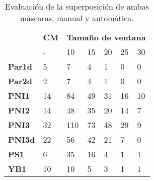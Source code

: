 \begin{table}[]
    \begin{threeparttable}[b]
        \caption{Evaluación de la superposición de ambas máscaras, manual y automática.}
        \begin{tabular}{l|l|lllll|}
            \cline{2-7}
            \multirow{2}{*}{}                    & \textbf{CM\tnote{1}} & \multicolumn{5}{l|}{\textbf{Tamaño de ventana}}                                                                             \\ \cline{3-7} 
                                                 & -           & \multicolumn{1}{l|}{10}     & \multicolumn{1}{l|}{15}     & \multicolumn{1}{l|}{20}    & \multicolumn{1}{l|}{25}    & 30    \\ \hline
            \multicolumn{1}{|l|}{\textbf{Par1d}} & 5           & \multicolumn{1}{l|}{7}      & \multicolumn{1}{l|}{4}      & \multicolumn{1}{l|}{1}     & \multicolumn{1}{l|}{0}     & 0     \\ \hline
            \multicolumn{1}{|l|}{\textbf{Par2d}} & 2           & \multicolumn{1}{l|}{7}      & \multicolumn{1}{l|}{4}      & \multicolumn{1}{l|}{1}     & \multicolumn{1}{l|}{0}     & 0     \\ \hline
            \multicolumn{1}{|l|}{\textbf{PNI1}}  & 14          & \multicolumn{1}{l|}{84}     & \multicolumn{1}{l|}{49}     & \multicolumn{1}{l|}{31}    & \multicolumn{1}{l|}{16}    & 10    \\ \hline
            \multicolumn{1}{|l|}{\textbf{PNI2}}  & 14          & \multicolumn{1}{l|}{48}     & \multicolumn{1}{l|}{35}     & \multicolumn{1}{l|}{20}    & \multicolumn{1}{l|}{14}    & 7     \\ \hline
            \multicolumn{1}{|l|}{\textbf{PNI3}}  & 32          & \multicolumn{1}{l|}{110}    & \multicolumn{1}{l|}{73}     & \multicolumn{1}{l|}{48}    & \multicolumn{1}{l|}{29}    & 9     \\ \hline
            \multicolumn{1}{|l|}{\textbf{PNI3d}} & 22          & \multicolumn{1}{l|}{56}     & \multicolumn{1}{l|}{42}     & \multicolumn{1}{l|}{21}    & \multicolumn{1}{l|}{7}     & 0     \\ \hline
            \multicolumn{1}{|l|}{\textbf{PS1}}   & 6           & \multicolumn{1}{l|}{35}     & \multicolumn{1}{l|}{16}     & \multicolumn{1}{l|}{4}     & \multicolumn{1}{l|}{1}     & 1     \\ \hline
            \multicolumn{1}{|l|}{\textbf{YB1}}   & 10          & \multicolumn{1}{l|}{10}     & \multicolumn{1}{l|}{5}      & \multicolumn{1}{l|}{3}     & \multicolumn{1}{l|}{1}     & 1     \\ \hline

\end{tabular}
\end{threeparttable}
\end{table}
